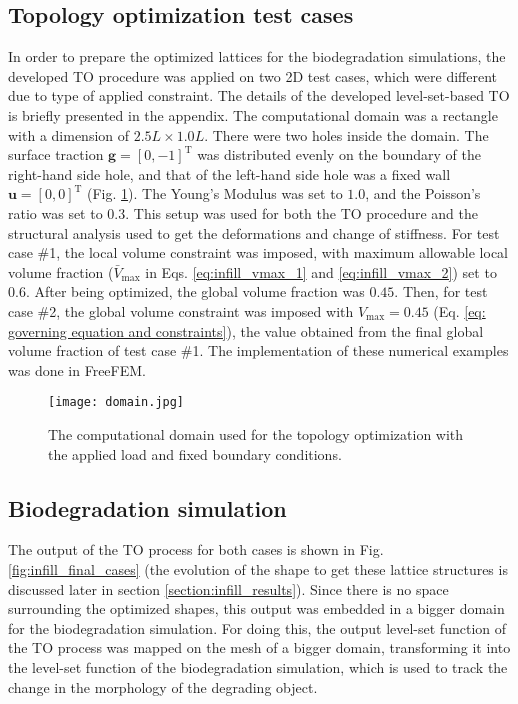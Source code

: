\subsection{Topology optimization test cases}\label{Section: numerical examples}
In order to prepare the optimized lattices for the biodegradation simulations, the developed \gls{TO} procedure was applied on two 2D test cases, which were different due to type of applied constraint. The details of the developed level-set-based TO is briefly presented in the appendix. The computational domain was a rectangle with a dimension of $2.5L \times 1.0L$. There were two holes inside the domain. The surface traction $\boldsymbol{g}=\left[0,-1\right]^{\operatorname{T}}$ was distributed evenly on the boundary of the right-hand side hole, and that of the left-hand side hole was a fixed wall $\boldsymbol{u}=\left[0,0\right]^{\operatorname{T}}$ (Fig. \ref{fig:infill_domain}). The Young's Modulus was set to $1.0$, and the Poisson's ratio was set to $0.3$. This setup was used for both the TO procedure and the structural analysis used to get the deformations and change of stiffness. For test case \#1, the local volume constraint was imposed, with maximum allowable local volume fraction ($\bar{V}_{\max}$ in Eqs. \ref{eq:infill_vmax_1} and \ref{eq:infill_vmax_2}) set to $0.6$. After being optimized, the global volume fraction was $0.45$. Then, for test case \#2, the global volume constraint was imposed with $V_{\max}=0.45$ (Eq. \ref{eq: governing equation and constraints}), the value obtained from the final global volume fraction of test case \#1. The implementation of these numerical examples was done in FreeFEM.

\begin{figure}[h]
\centering
\medskip
\texttt{[image: domain.jpg]}
\caption[Computational domain for the topology optimization]{The computational domain used for the topology optimization with the applied load and fixed boundary conditions.} \label{fig:infill_domain}
\end{figure}

\subsection{Biodegradation simulation}\label{section:biodegradation}

The output of the \gls{TO} process for both cases is shown in Fig. \ref{fig:infill_final_cases} (the evolution of the shape to get these lattice structures is discussed later in section \ref{section:infill_results}). Since there is no space surrounding the optimized shapes, this output was embedded in a bigger domain for the biodegradation simulation. For doing this, the output level-set function of the \gls{TO} process was mapped on the mesh of a bigger domain, transforming it into the level-set function of the biodegradation simulation, which is used to track the change in the morphology of the degrading object.

